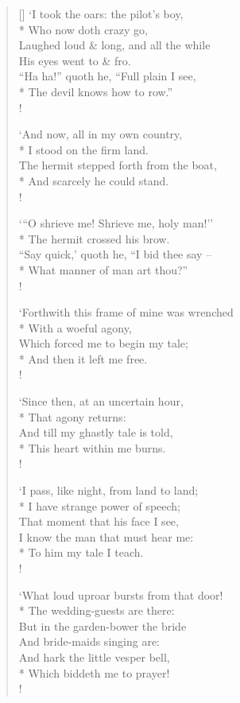 \documentclass[MAIN]{subfiles}
\begin{document}
\begin{verse}[\versewidth]
`I took the oars: the pilot's boy,\\*
\vin Who now doth crazy go,\\
Laughed loud \& long, and all the while\\
\vin His eyes went to \& fro.\\
``Ha ha!'' quoth he, ``Full plain I see,\\* 
\vin The devil knows how to row.''\\!

`And now, all in my own country,\\*
\vin I stood on the firm land.\\
The hermit stepped forth from the boat,\\*
\vin And scarcely he could stand.\\!

`{``}O shrieve me! Shrieve me, holy man!''\\*
\vin The hermit crossed his brow.\\
``Say quick,' quoth he, ``I bid thee say --\\*
\vin What manner of man art thou?''\\!

`Forthwith this frame of mine was wrenched\\*
\vin With a woeful agony,\\
Which forced me to begin my tale;\\*
\vin And then it left me free.\\!

`Since then, at an uncertain hour,\\*
\vin That agony returns:\\
And till my ghastly tale is told,\\*
\vin This heart within me burns.\\!

`I pass, like night, from land to land;\\* 
\vin I have strange power of speech;\\
That moment that his face I see,\\
I know the man that must hear me:\\*
\vin To him my tale I teach.\\!

`What loud uproar bursts from that door!\\*
\vin The wedding-guests are there:\\
But in the garden-bower the bride\\
\vin And bride-maids singing are:\\
And hark the little vesper bell,\\*
\vin Which biddeth me to prayer!\\!


\end{verse}
\end{document}
